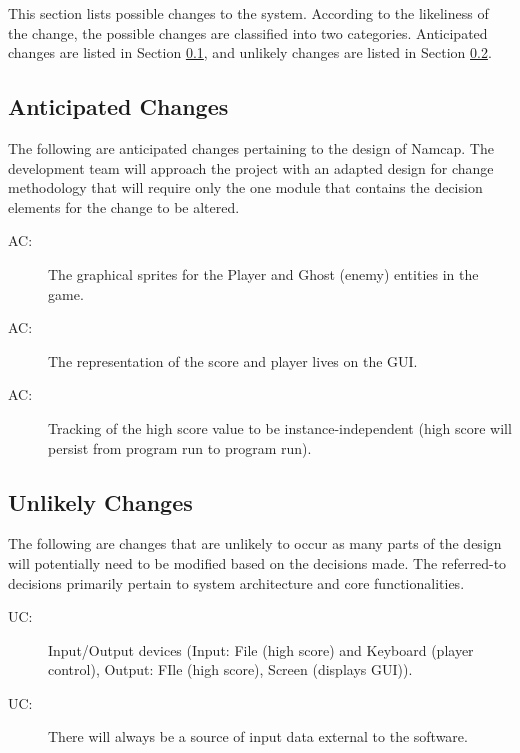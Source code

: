 \documentclass[12pt, titlepage]{article}
\newcounter{acnum}
\newcommand{\actheacnum}{AC\theacnum}
\newcounter{ucnum}
\newcommand{\uctheucnum}{UC\theucnum}
\begin{document}
This section lists possible changes to the system. According to the likeliness
of the change, the possible changes are classified into two
categories. Anticipated changes are listed in Section \ref{SecAchange}, and
unlikely changes are listed in Section \ref{SecUchange}.

\subsection{Anticipated Changes} \label{SecAchange}

The following are anticipated changes pertaining to the design of Namcap. The development team will approach the project with an adapted design for change methodology that will require only the one module that contains the decision elements for the change to be altered.

\begin{description}
\item[ \actheacnum \label{acSprites}:] The graphical sprites for the Player and Ghost (enemy) entities in the game.
\item[ \actheacnum \label{acStats}:] The representation of the score and player lives on the GUI.
\item[ \actheacnum \label{acHScore}:] Tracking of the high score value to be instance-independent (high score will persist from program run to program run).
\end{description}

\subsection{Unlikely Changes} \label{SecUchange}

The following are changes that are unlikely to occur as many parts of the design will potentially need to be modified based on the decisions made. The referred-to decisions primarily pertain to system architecture and core functionalities.

\begin{description}
\item[ \uctheucnum \label{ucIO}:] Input/Output devices (Input: File (high score) and Keyboard (player control), Output: FIle (high score), Screen (displays GUI)).
\item[ \uctheucnum \label{ucInput}:] There will always be a source of input data external to the software.
\end{description}
\end{document}
